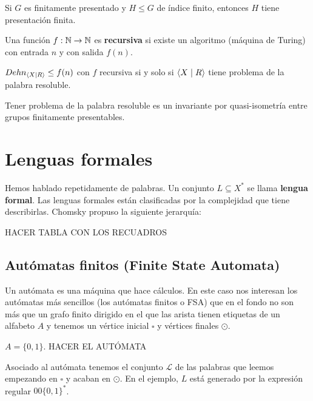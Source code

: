 \documentclass[twoside, 11pt]{article}
\begin{document}
\begin{coro}
Si $G$ es finitamente presentado y $H\leq G$ de índice finito, entonces $H$ tiene presentación finita.
\end{coro}

\begin{defi}
Una función $f:\mathbb{N}\to\mathbb{N}$ es \textbf{recursiva} si existe un algoritmo (máquina de Turing) con entrada $n$ y con salida $f(n)$. 
\end{defi}

\begin{teorema}
$Dehn_{\langle{X\mid R}\rangle}\leq f(n)$ con $f$ recursiva si y solo si $\langle{X\mid R}\rangle$ tiene problema de la palabra resoluble. 
\end{teorema}


\begin{coro}
Tener problema de la palabra resoluble es un invariante por quasi-isometría entre grupos finitamente presentables. 
\end{coro}

\section{Lenguas formales}

Hemos hablado repetidamente de palabras. Un conjunto $L\subseteq X^*$ se llama \textbf{lengua formal}. Las lenguas formales están clasificadas por la complejidad que tiene describirlas. Chomsky propuso la siguiente jerarquía:

HACER TABLA CON LOS RECUADROS


\subsection{Autómatas finitos (Finite State Automata)}

Un autómata es una máquina que hace cálculos. En este caso nos interesan los autómatas más sencillos (los autómatas finitos o FSA) que en el fondo no son más que un grafo finito dirigido en el que las arista tienen etiquetas de un alfabeto $A$ y tenemos un vértice inicial $\square$ y vértices finales $\odot$.

\begin{ej}
$A=\{0,1\}$.
HACER EL AUTÓMATA

Asociado al autómata tenemos el conjunto $\mathcal{L}$ de las palabras que leemos empezando en $\square$ y acaban en $\odot$. En el ejemplo, $L$ está generado por la expresión regular $00\{0,1\}^*$.
\end{ej}
\end{document}
